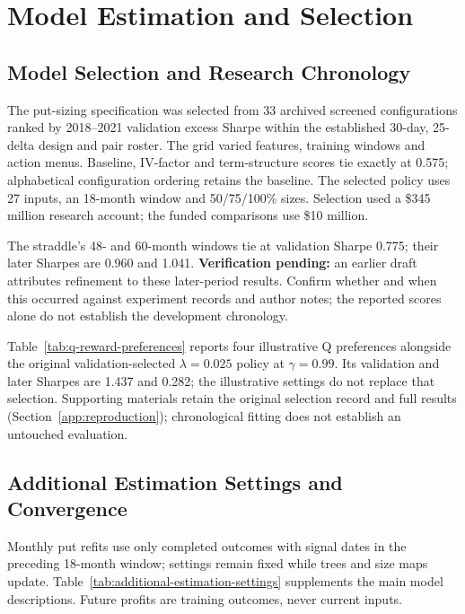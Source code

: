 \clearpage
\section{Model Estimation and Selection}\label{app:b}\label{app:g}

\subsection{Model Selection and Research Chronology}\label{app:feature-selection}\label{sec:10}\label{app:research-chronology}

The put-sizing specification was selected from 33 archived screened configurations ranked by 2018--2021 validation excess Sharpe within the established 30-day, 25-delta design and pair roster. The grid varied features, training windows and action menus. Baseline, IV-factor and term-structure scores tie exactly at 0.575; alphabetical configuration ordering retains the baseline. The selected policy uses 27 inputs, an 18-month window and 50/75/100\% sizes. Selection used a \$345 million research account; the funded comparisons use \$10 million.

The straddle's 48- and 60-month windows tie at validation Sharpe 0.775; their later Sharpes are 0.960 and 1.041. \textbf{Verification pending:} an earlier draft attributes refinement to these later-period results. Confirm whether and when this occurred against experiment records and author notes; the reported scores alone do not establish the development chronology.

Table~\ref{tab:q-reward-preferences} reports four illustrative Q preferences alongside the original validation-selected \(\lambda=0.025\) policy at \(\gamma=0.99\). Its validation and later Sharpes are 1.437 and 0.282; the illustrative settings do not replace that selection. Supporting materials retain the original selection record and full results (Section~\ref{app:reproduction}); chronological fitting does not establish an untouched evaluation.

\subsection{Additional Estimation Settings and Convergence}\label{app:entry-optimization}\label{app:q-convergence}\label{app:refitting-timeline}

Monthly put refits use only completed outcomes with signal dates in the preceding 18-month window; settings remain fixed while trees and size maps update. Table~\ref{tab:additional-estimation-settings} supplements the main model descriptions. Future profits are training outcomes, never current inputs.

